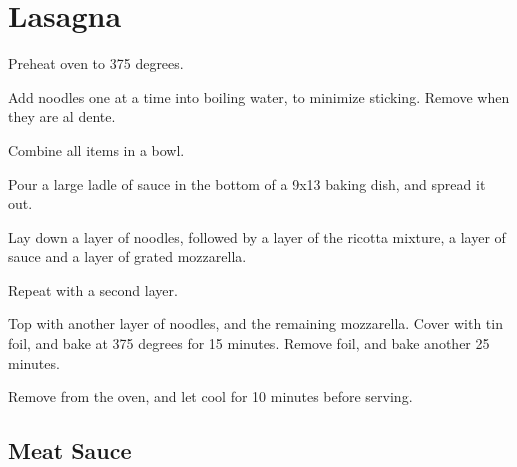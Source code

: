 
\section{Lasagna}
\begin{recipe}


Preheat oven to 375 degrees.


Add noodles one at a time into boiling water, to minimize sticking. Remove when they are al dente.


Combine all items in a bowl.


Pour a large ladle of sauce in the bottom of a 9x13 baking dish, and spread it out.

Lay down a layer of noodles, followed by a layer of the ricotta mixture, a layer of sauce and a layer of grated mozzarella.

Repeat with a second layer.

Top with another layer of noodles, and the remaining mozzarella. Cover with tin foil, and bake at 375 degrees for 15 minutes. Remove foil, and bake another 25 minutes.

Remove from the oven, and let cool for 10 minutes before serving.

\subsection{Meat Sauce}




\end{recipe}
